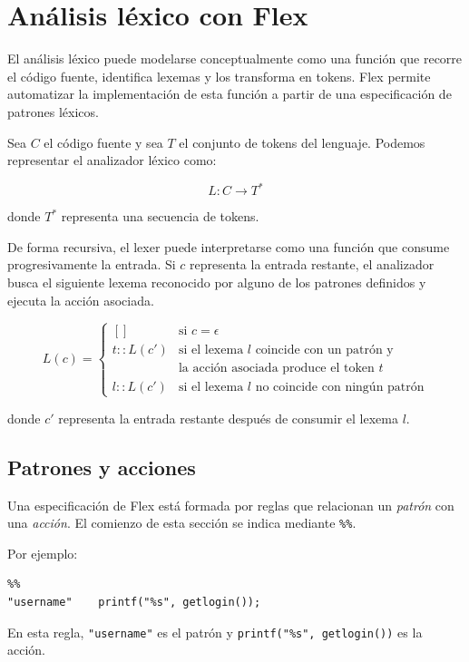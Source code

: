 \documentclass{article}
\begin{document}
\section{Análisis léxico con Flex}

El análisis léxico puede modelarse conceptualmente como una función que
recorre el código fuente, identifica lexemas y los transforma en tokens.
Flex permite automatizar la implementación de esta función a partir de una
especificación de patrones léxicos.

Sea $C$ el código fuente y sea $T$ el conjunto de tokens del lenguaje.
Podemos representar el analizador léxico como:

\[
L : C \rightarrow T^*
\]

donde $T^*$ representa una secuencia de tokens.

De forma recursiva, el lexer puede interpretarse como una función que
consume progresivamente la entrada. Si $c$ representa la entrada restante,
el analizador busca el siguiente lexema reconocido por alguno de los
patrones definidos y ejecuta la acción asociada.

\[
L(c) =
\begin{cases}
[] & \text{si } c = \epsilon \\[4pt]
t :: L(c') & \text{si el lexema } l \text{ coincide con un patrón y}\\
& \text{la acción asociada produce el token } t \\[4pt]
l :: L(c') & \text{si el lexema } l \text{ no coincide con ningún patrón}
\end{cases}
\]

donde $c'$ representa la entrada restante después de consumir el lexema
$l$.

\subsection{Patrones y acciones}

Una especificación de Flex está formada por reglas que relacionan un
\textit{patrón} con una \textit{acción}. El comienzo de esta sección se
indica mediante \texttt{\%\%}.

Por ejemplo:

\begin{verbatim}
%%
"username"    printf("%s", getlogin());
\end{verbatim}

En esta regla, \texttt{"username"} es el patrón y
\texttt{printf("\%s", getlogin())} es la acción.
\end{document}
